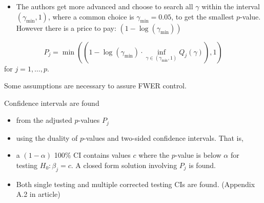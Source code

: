 \documentclass[
  ignorenonframetext,
]{beamer}
\providecommand{\tightlist}{%
  \setlength{\itemsep}{0pt}\setlength{\parskip}{0pt}}
\begin{document}
\begin{frame}

\begin{itemize}
\tightlist
\item
  The authors get more advanced and choose to search all \(\gamma\)
  within the interval \((\gamma_{\text{min}},1)\), where a common choice
  is \(\gamma_{\text{min}}=0.05\), to get the smallest \(p\)-value.
  However there is a price to pay: \((1-\log(\gamma_{\text{min}}))\)
\end{itemize}

\[ P_j=\min((1-\log(\gamma_{\text{min}})\cdot \inf_{\gamma \in (\gamma_{\text{min}},1)} Q_j(\gamma)),1)\]
for \(j=1,\ldots,p\).

Some assumptions are necessary to assure FWER control.

\end{frame}

\begin{frame}

Confidence intervals are found

\begin{itemize}
\tightlist
\item
  from the adjusted \(p\)-values \(P_j\)
\item
  using the duality of \(p\)-values and two-sided confidence intervals.
  That is,
\item
  a \((1-\alpha)\) 100\% CI contains values \(c\) where the \(p\)-value
  is below \(\alpha\) for testing \(H_0: \beta_j=c\). A closed form
  solution involving \(P_j\) is found.
\item
  Both single testing and multiple corrected testing CIs are found.
  (Appendix A.2 in article)
\end{itemize}

\end{frame}
\end{document}
